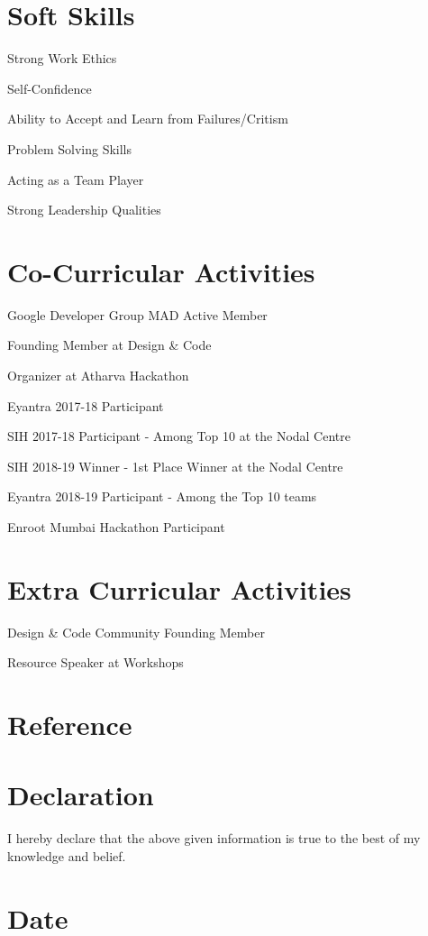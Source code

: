 \documentclass[11pt]{article}
\begin{document}
\section{Soft Skills}
\begin{description} 
\item{Strong Work Ethics}
\item {Self-Confidence}
\item {Ability to Accept and Learn from Failures/Critism}
\item {Problem Solving Skills}
\item {Acting as a Team Player}
\item {Strong Leadership Qualities}
\end{description}

\section{Co-Curricular Activities}
\begin{description}
\item {Google Developer Group MAD Active Member}
\item {Founding Member at Design \& Code}
\item {Organizer at Atharva Hackathon}
\item {Eyantra 2017-18 Participant}
\item {SIH 2017-18 Participant - Among Top 10 at the Nodal Centre}
\item {SIH 2018-19 Winner - 1st Place Winner at the Nodal Centre}
\item {Eyantra 2018-19 Participant - Among the Top 10 teams}
\item {Enroot Mumbai Hackathon Participant}
\end{description}
\section{Extra Curricular Activities}
\begin{description}
\item {Design \& Code Community Founding Member}
\item {Resource Speaker at Workshops}
\end{description}
\section{Reference}
\section{Declaration}
I hereby declare that the above given information is true to the best of my knowledge and belief.
\section{Date}
\end{document}
